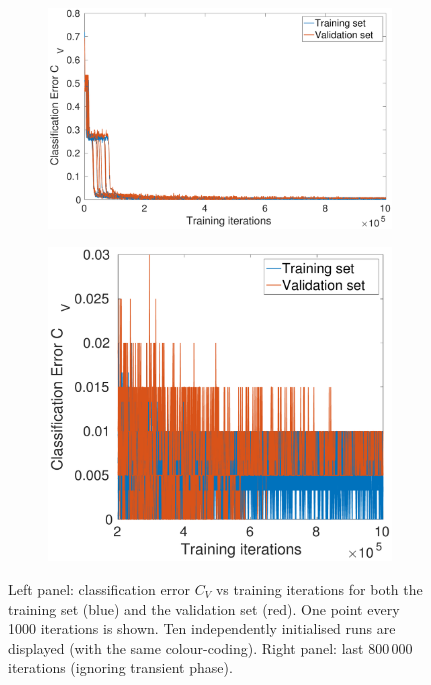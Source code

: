 \documentclass[12pt,titlepage]{article}
\begin{document}
\begin{figure}[H]
\centering
    \begin{subfigure}[b]{0.58\textwidth}
        \includegraphics[width=\textwidth]{../Figures/twoHL_error.pdf}
        \caption{}
    \end{subfigure} %
    \hfill %
    \begin{subfigure}[b]{0.41\textwidth}
        \includegraphics[width=\textwidth]{../Figures/twoHL_error_zoom.pdf}
        \caption{}
    \end{subfigure} %
\caption{\footnotesize Left panel: classification error $C_V$ vs training iterations for both the training set (blue) and the validation set (red). One point every 1000 iterations is shown. Ten independently initialised runs are displayed (with the same colour-coding). Right panel: last $800\,000$ iterations (ignoring transient phase).}
\label{fig:2e}
\end{figure}
\end{document}
